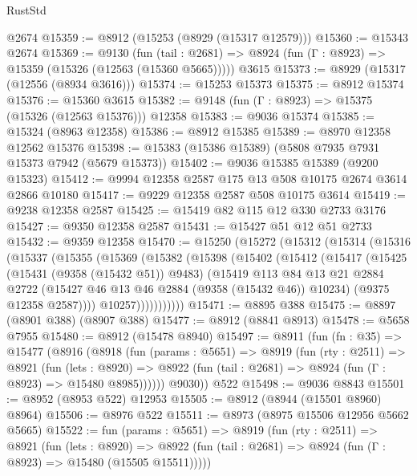 \begin{lexlean}{RustStd}
\begin{coremodule}
    @2674
@15359 := @8912 (@15253 (@8929 (@15317 @12579)))
@15360 := @15343 @2674
@15369 := @9130
    (fun (tail : @2681) => @8924 (fun (Γ : @8923) => @15359 (@15326 (@12563 (@15360 @5665)))))
    @3615
@15373 := @8929 (@15317 (@12556 (@8934 @3616)))
@15374 := @15253 @15373
@15375 := @8912 @15374
@15376 := @15360 @3615
@15382 := @9148 (fun (Γ : @8923) => @15375 (@15326 (@12563 @15376))) @12358
@15383 := @9036 @15374
@15385 := @15324 (@8963 @12358)
@15386 := @8912 @15385
@15389 := @8970 @12358 @12562 @15376
@15398 := @15383 (@15386 @15389) (@5808 @7935 @7931 @15373 @7942 (@5679 @15373))
@15402 := @9036 @15385 @15389 (@9200 @15323)
@15412 := @9994 @12358 @2587 @175 @13 @508 @10175 @2674 @3614 @2866 @10180
@15417 := @9229 @12358 @2587 @508 @10175 @3614
@15419 := @9238 @12358 @2587
@15425 := @15419 @82 @115 @12 @330 @2733 @3176
@15427 := @9350 @12358 @2587
@15431 := @15427 @51 @12 @51 @2733
@15432 := @9359 @12358
@15470 := @15250
    (@15272
      (@15312
        (@15314
          (@15316
            (@15337
              (@15355
                (@15369
                  (@15382
                    (@15398
                      (@15402
                        (@15412
                          (@15417
                            (@15425
                              (@15431 (@9358 (@15432 @51)) @9483)
                              (@15419
                                @113
                                @84
                                @13
                                @21
                                @2884
                                @2722
                                (@15427 @46 @13 @46 @2884 (@9358 (@15432 @46)) @10234)
                                (@9375 @12358 @2587))))
                          @10257)))))))))))
@15471 := @8895 @388
@15475 := @8897 (@8901 @388) (@8907 @388)
@15477 := @8912 (@8841 @8913)
@15478 := @5658 @7955
@15480 := @8912 (@15478 @8940)
@15497 := @8911
    (fun (fn : @35) =>
    @15477
      (@8916
        (@8918
          (fun (params : @5651) =>
          @8919
            (fun (rty : @2511) =>
            @8921
              (fun (lets : @8920) =>
              @8922 (fun (tail : @2681) => @8924 (fun (Γ : @8923) => @15480 @8985))))))
        @9030))
    @522
@15498 := @9036 @8843
@15501 := @8952 (@8953 @522) @12953
@15505 := @8912 (@8944 (@15501 @8960) @8964)
@15506 := @8976 @522
@15511 := @8973 (@8975 @15506 @12956 @5662 @5665)
@15522 := fun (params : @5651) =>
  @8919
    (fun (rty : @2511) =>
    @8921
      (fun (lets : @8920) =>
      @8922 (fun (tail : @2681) => @8924 (fun (Γ : @8923) => @15480 (@15505 @15511)))))

\end{coremodule}
\end{lexlean}
